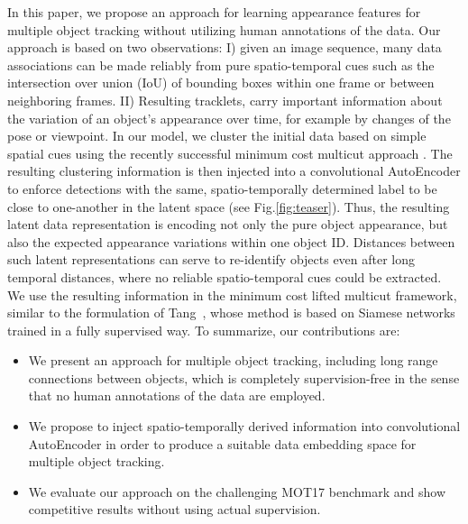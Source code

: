 
In this paper, we propose an approach for learning appearance features for multiple object tracking without utilizing human annotations of the data. 
Our approach is based on two observations:  I) given an image sequence, many data associations can be made reliably from pure spatio-temporal cues such as the intersection over union (IoU) of bounding boxes within one frame or between neighboring frames. 
II) Resulting tracklets, carry important information about the variation of an object's appearance over time, for example by changes of the pose or viewpoint. 
In our model, we cluster the initial data based on simple spatial cues using the recently successful minimum cost multicut approach \cite{tang2016multi}. 
The resulting clustering information is then injected into a convolutional AutoEncoder to enforce detections with the same, spatio-temporally determined label to be close to one-another in the latent space (see Fig.\ref{fig:teaser}). 
Thus, the resulting latent data representation is encoding not only the pure object appearance, but also the expected appearance variations within one object ID. 
Distances between such latent representations can serve to re-identify objects even after long temporal distances, where no reliable spatio-temporal cues could be extracted. 
We use the resulting information in the minimum cost lifted multicut framework, similar to the formulation of Tang~\cite{tang2017multiple}, whose method is based on Siamese networks trained in a fully supervised way. To summarize, our contributions are:
\begin{itemize}
    \item We present an approach for multiple object tracking, including long range connections between objects, which is completely supervision-free in the sense that no human annotations of the data are employed.
	\item We propose to inject spatio-temporally derived information into convolutional AutoEncoder in order to produce a suitable data embedding space for multiple object tracking.
	\item  We evaluate our approach on the challenging MOT17 benchmark and show competitive results without using actual supervision. 
\end{itemize}

